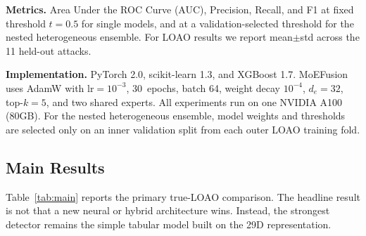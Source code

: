 ﻿\documentclass[sigconf,review,anonymous]{acmart}
\newcommand{\sys}{MoEFusion}
\begin{document}
\textbf{Metrics.}
Area Under the ROC Curve (AUC), Precision, Recall, and F1 at fixed threshold
$t{=}0.5$ for single models, and at a validation-selected threshold for the
nested heterogeneous ensemble.
For LOAO results we report mean$\pm$std across the 11 held-out attacks.

\textbf{Implementation.}
PyTorch 2.0, scikit-learn 1.3, and XGBoost 1.7.
\sys{} uses AdamW with $\text{lr}{=}10^{-3}$, 30~epochs, batch 64, weight decay
$10^{-4}$, $d_e{=}32$, top-$k{=}5$, and two shared experts.
All experiments run on one NVIDIA A100 (80GB).
For the nested heterogeneous ensemble, model weights and thresholds are selected
only on an inner validation split from each outer LOAO training fold.

\subsection{Main Results}
\label{sec:exp:main}

Table~\ref{tab:main} reports the primary true-LOAO comparison.
The headline result is not that a new neural or hybrid architecture wins.
Instead, the strongest detector remains the simple tabular model built on the
29D representation.

\begin{table}[t]
\centering
\caption{True 11-fold LOAO results (mean$\pm$std across held-out attacks).
For single models, metrics use fixed threshold $t{=}0.5$.
For the heterogeneous ensemble, weights and threshold are selected on an inner
validation split in each fold. \textbf{Bold} = best mean in column.}
\label{tab:main}
\footnotesize
\setlength{\tabcolsep}{3pt}
\end{table}
\end{document}
